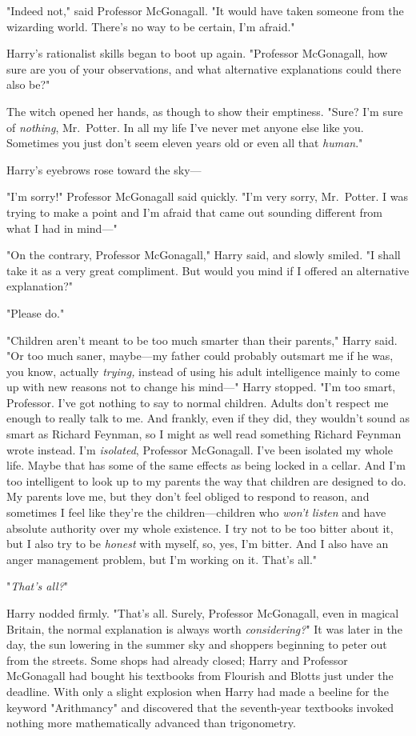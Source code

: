 "Indeed not," said Professor McGonagall. "It would have taken someone from the
wizarding world. There's{\el} no way to be certain, I'm afraid."

Harry's rationalist skills began to boot up again. "Professor McGonagall, how
sure are you of your observations, and what alternative explanations could
there also be?"

The witch opened her hands, as though to show their emptiness. "Sure? I'm sure
of \emph{nothing}, Mr.~Potter. In all my life I've never met anyone else like
you. Sometimes you just don't seem eleven years old or even all that
\emph{human}."

Harry's eyebrows rose toward the sky—

"I'm sorry!" Professor McGonagall said quickly. "I'm very sorry, Mr.~Potter. I
was trying to make a point and I'm afraid that came out sounding different from
what I had in mind—"

"On the contrary, Professor McGonagall," Harry said, and slowly smiled. "I
shall take it as a very great compliment. But would you mind if I offered an
alternative explanation?"

"Please do."

"Children aren't meant to be too much smarter than their parents," Harry said.
"Or too much saner, maybe—my father could probably outsmart me if he was, you
know, actually \emph{trying,} instead of using his adult intelligence mainly to
come up with new reasons not to change his mind—" Harry stopped. "I'm too
smart, Professor. I've got nothing to say to normal children. Adults don't
respect me enough to really talk to me. And frankly, even if they did, they
wouldn't sound as smart as Richard Feynman, so I might as well read something
Richard Feynman wrote instead. I'm \emph{isolated}, Professor McGonagall. I've
been isolated my whole life. Maybe that has some of the same effects as being
locked in a cellar. And I'm too intelligent to look up to my parents the way
that children are designed to do. My parents love me, but they don't feel
obliged to respond to reason, and sometimes I feel like they're the
children—children who \emph{won't listen} and have absolute authority over my
whole existence. I try not to be too bitter about it, but I also try to be
\emph{honest} with myself, so, yes, I'm bitter. And I also have an anger
management problem, but I'm working on it. That's all."

"\emph{That's all?}"

Harry nodded firmly. "That's all. Surely, Professor McGonagall, even in magical
Britain, the normal explanation is always worth \emph{considering?}"
\sbreak
It was later in the day, the sun lowering in the summer sky and shoppers
beginning to peter out from the streets. Some shops had already closed; Harry
and Professor McGonagall had bought his textbooks from Flourish and Blotts just
under the deadline. With only a slight explosion when Harry had made a beeline
for the keyword "Arithmancy" and discovered that the seventh-year textbooks
invoked nothing more mathematically advanced than trigonometry.

